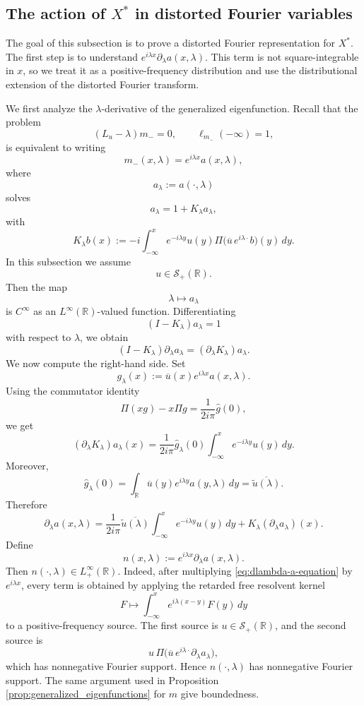 \documentclass[10pt]{article}
\numberwithin{equation}{section}
\numberwithin{theorem}{section}
\begin{document}
\subsection{The action of \(X^*\) in distorted Fourier variables}

The goal of this subsection is to prove a distorted Fourier representation for \(X^*\).
The first step is to understand $e^{i\lambda x}\partial_\lambda a(x,\lambda)$. This term is not square-integrable in \(x\), so we treat it as a
positive-frequency distribution and use the distributional extension of the distorted
Fourier transform.

We first analyze the \(\lambda\)-derivative of the generalized eigenfunction. Recall that
the problem
\[
(L_u-\lambda)m_-=0,
\qquad
\ell_{m_-}(-\infty)=1,
\]
is equivalent to writing
\[
m_-(x,\lambda)=e^{i\lambda x}a(x,\lambda),
\]
where
\[
a_\lambda:=a(\cdot,\lambda)
\]
solves
\[
a_\lambda=1+K_\lambda a_\lambda,
\]
with
\[
K_\lambda b(x)
:=
-i\int_{-\infty}^x
e^{-i\lambda y}u(y)
\Pi\bigl(\overline u\,e^{i\lambda\cdot}b\bigr)(y)\,dy .
\]
In this subsection we assume
\[
u\in\mathcal S_+(\mathbb R).
\]
Then the map
\[
\lambda\mapsto a_\lambda
\]
is \(C^\infty\) as an \(L^\infty(\mathbb R)\)-valued function. Differentiating
\[
(I-K_\lambda)a_\lambda=1
\]
with respect to \(\lambda\), we obtain
\[
(I-K_\lambda)\partial_\lambda a_\lambda
=
(\partial_\lambda K_\lambda)a_\lambda .
\]
We now compute the right-hand side. Set
\[
g_\lambda(x):=\overline u(x)e^{i\lambda x}a(x,\lambda).
\]
Using the commutator identity
\[
\Pi(xg)-x\Pi g
=
\frac1{2i\pi}\widehat g(0),
\]
we get
\[
(\partial_\lambda K_\lambda)a_\lambda(x)
=
\frac1{2i\pi}\widehat g_\lambda(0)
\int_{-\infty}^x e^{-i\lambda y}u(y)\,dy .
\]
Moreover,
\[
\widehat g_\lambda(0)
=
\int_{\mathbb R}
\overline u(y)e^{i\lambda y}a(y,\lambda)\,dy
=
\overline{\widetilde u(\lambda)}.
\]
Therefore
\begin{equation}
\label{eq:dlambda-a-equation}
\partial_\lambda a(x,\lambda)
=
\frac1{2i\pi}
\overline{\widetilde u(\lambda)}
\int_{-\infty}^x e^{-i\lambda y}u(y)\,dy
+
K_\lambda(\partial_\lambda a_\lambda)(x).
\end{equation}
Define
\[
n(x,\lambda):=e^{i\lambda x}\partial_\lambda a(x,\lambda).
\]
Then \(n(\cdot,\lambda)\in L^\infty_+(\mathbb R)\). Indeed, after multiplying
\eqref{eq:dlambda-a-equation} by \(e^{i\lambda x}\), every term is obtained by applying
the retarded free resolvent kernel
\[
F\mapsto \int_{-\infty}^x e^{i\lambda(x-y)}F(y)\,dy
\]
to a positive-frequency source. The first source is \(u\in\mathcal S_+(\mathbb R)\), and
the second source is
\[
u\,\Pi\bigl(\overline u\,e^{i\lambda\cdot}\partial_\lambda a_\lambda\bigr),
\]
which has nonnegative Fourier support. Hence \(n(\cdot,\lambda)\) has nonnegative Fourier
support. The same argument used in Proposition \ref{prop:generalized_eigenfunctions} for \(m\) give boundedness.
\end{document}
